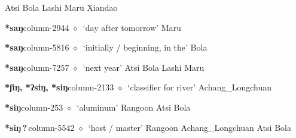 \hspace{1ex}
         Atsi 
\hspace{1ex}
         Bola 
\hspace{1ex}
         Lashi 
\hspace{1ex}
         Maru 
\hspace{1ex}
         Xiandao 
  \item {\footnotesize \textbf{*saŋ}}{\tiny column-2944}
         $\diamond$~`day after tomorrow'
         Maru 
  \item {\footnotesize \textbf{*saŋ}}{\tiny column-5816}
         $\diamond$~`initially / beginning, in the'
         Bola 
  \item {\footnotesize \textbf{*saŋ}}{\tiny column-7257}
         $\diamond$~`next year'
         Atsi 
\hspace{1ex}
         Bola 
\hspace{1ex}
         Lashi 
\hspace{1ex}
         Maru 
  \item {\footnotesize \textbf{*ʃiŋ, *ʔsiŋ, *siŋ}}{\tiny column-2133}
         $\diamond$~`classifier for river'
         Achang\_Longchuan 
  \item {\footnotesize \textbf{*siŋ}}{\tiny column-253}
         $\diamond$~`aluminum'
         Rangoon 
\hspace{1ex}
         Atsi 
\hspace{1ex}
         Bola 
  \item {\footnotesize \textbf{*siŋ\,?\,}}{\tiny column-5542}
         $\diamond$~`host / master'
         Rangoon 
\hspace{1ex}
         Achang\_Longchuan 
\hspace{1ex}
         Atsi 
\hspace{1ex}
         Bola 
